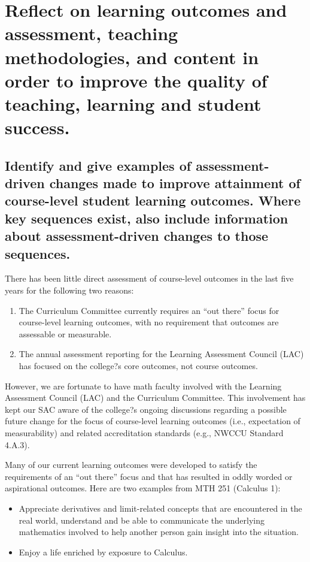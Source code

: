 \chapter[Outcomes and Assessment]{Reflect on learning outcomes and assessment, teaching methodologies, and content in order to improve the quality of teaching, learning and student success.}

\section[Course-Level Outcomes]{Identify and give examples of assessment-driven changes made to improve attainment of course-level student learning outcomes.   Where key sequences exist, also include information about assessment-driven changes to those sequences.}

There has been little direct assessment of course-level outcomes in the last five years for the following two reasons: 
\begin{enumerate}
\item The Curriculum Committee currently requires an ``out there'' focus for course-level learning outcomes, with no requirement that outcomes are assessable or measurable.
\item The annual assessment reporting for the Learning Assessment Council (LAC) has focused on the college?s core outcomes, not course outcomes.  
\end{enumerate}


However, we are fortunate to have math faculty involved with the Learning Assessment Council (LAC) and the Curriculum Committee. This involvement has kept our SAC aware of the college?s ongoing discussions regarding a possible future change for the focus of course-level learning outcomes  (i.e., expectation of measurability) and related accreditation standards (e.g., NWCCU Standard 4.A.3).

Many of our current learning outcomes were developed to satisfy the requirements of an ``out there'' focus and that has resulted in oddly worded or aspirational outcomes.  Here are two examples from MTH 251 (Calculus 1):

\begin{itemize}
\item Appreciate derivatives and limit-related concepts that are encountered in the real world, understand and be able to communicate the underlying mathematics involved to help another person gain insight into the situation.
\item Enjoy a life enriched by exposure to Calculus.
\end{itemize}

